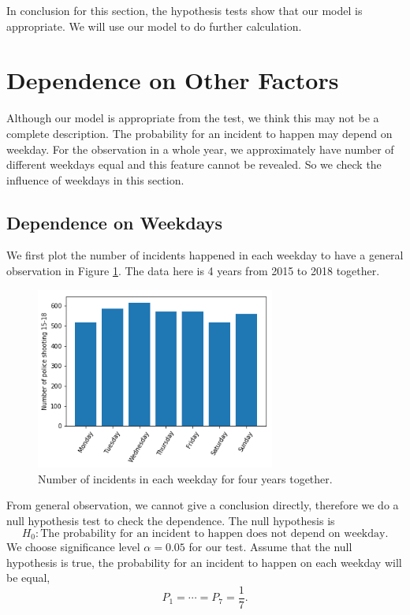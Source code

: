 \documentclass[11pt,a4paper,english]{article}
\begin{document}
In conclusion for this section, the hypothesis tests show that our model is appropriate. We will use our model to do further calculation.

\section{Dependence on Other Factors}
Although our model is appropriate from the test, we think this may not be a complete description. 
The probability for an incident to happen may depend on weekday. For the observation in a whole year, we approximately have number of different weekdays equal and this feature cannot be revealed.
So we check the influence of weekdays in this section.

\subsection{Dependence on Weekdays}
We first plot the number of incidents happened in each weekday to have a general observation in Figure \ref{fig:weekdays}. The data here is 4 years from 2015 to 2018 together.
\begin{figure}[htbp]
	\centering
	\includegraphics[width=0.7\textwidth]{weekdays.png}
	\caption{Number of incidents in each weekday for four years together.}
	\label{fig:weekdays}
\end{figure}
From general observation, we cannot give a conclusion directly,
therefore we do a null hypothesis test to check the dependence.
The null hypothesis is
\begin{equation*}
	H_{0}:
	\text{The probability for an incident to happen does not depend on weekday.}
\end{equation*} 
We choose significance level $\alpha = 0.05$ for our test.
Assume that the null hypothesis is true, the probability for an incident to happen on each weekday will be equal,
\begin{equation*}
	P_{1} = \cdots = P_{7} = \frac{1}{7}.
\end{equation*}
\end{document}
